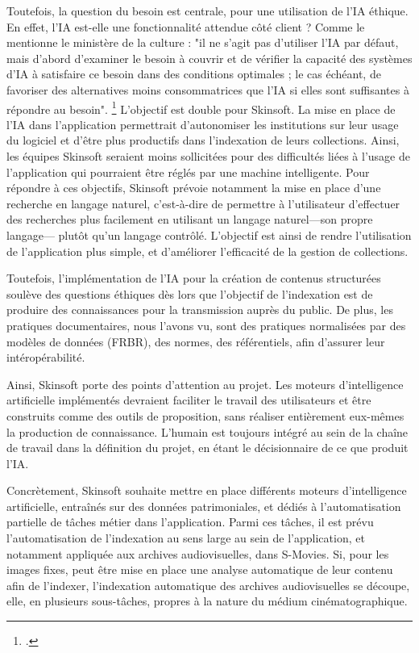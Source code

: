 Toutefois, la question du besoin est centrale, pour une utilisation de l'IA éthique. En effet, l'IA est-elle une fonctionnalité attendue côté client ? Comme le mentionne le ministère de la culture : "il ne s’agit pas d’utiliser l’IA par défaut, mais d’abord d’examiner le besoin à couvrir et de vérifier la capacité des systèmes d’IA à satisfaire ce besoin dans des conditions optimales ; le cas échéant, de favoriser des alternatives moins consommatrices que l’IA si elles sont suffisantes à répondre au besoin". \footcite{2025a} L'objectif est double pour Skinsoft. La mise en place de l'IA dans l'application permettrait d'autonomiser les institutions sur leur usage du logiciel et d'être plus productifs dans l'indexation de leurs collections. Ainsi, les équipes Skinsoft seraient moins sollicitées pour des difficultés liées à l'usage de l'application qui pourraient être réglés par une machine intelligente. Pour répondre à ces objectifs, Skinsoft prévoie notamment la mise en place d'une recherche en langage naturel, c'est-à-dire de permettre à l'utilisateur d'effectuer des recherches plus facilement en utilisant un langage naturel---son propre langage--- plutôt qu'un langage contrôlé. L'objectif est ainsi de rendre l'utilisation de l'application plus simple, et d'améliorer l'efficacité de la gestion de collections. 

Toutefois, l'implémentation de l'IA pour la création de contenus structurées soulève des questions éthiques dès lors que l'objectif de l'indexation est de produire des connaissances pour la transmission auprès du public. De plus, les pratiques documentaires, nous l'avons vu, sont des pratiques normalisées par des modèles de données (FRBR), des normes, des référentiels, afin d'assurer leur intéropérabilité.  

Ainsi, Skinsoft porte des points d'attention au projet. Les moteurs d'intelligence artificielle implémentés devraient faciliter le travail des utilisateurs et être construits comme des outils de proposition, sans réaliser entièrement eux-mêmes la production de connaissance. L'humain est toujours intégré au sein de la chaîne de travail dans la définition du projet, en étant le décisionnaire de ce que produit l'IA.  

Concrètement, Skinsoft souhaite mettre en place différents moteurs d'intelligence artificielle, entraînés sur des données patrimoniales, et dédiés à l'automatisation partielle de tâches métier dans l'application. Parmi ces tâches, il est prévu l'automatisation de l'indexation au sens large au sein de l'application, et notamment appliquée aux archives audiovisuelles, dans S-Movies. Si, pour les images fixes, peut être mise en place une analyse automatique de leur contenu afin de l'indexer,  l'indexation automatique des archives audiovisuelles se découpe, elle, en plusieurs sous-tâches, propres à la nature du médium cinématographique.  

